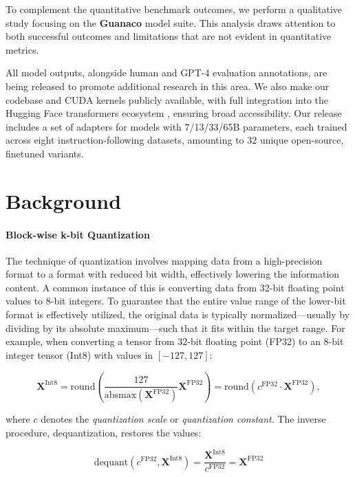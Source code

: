 To complement the quantitative benchmark outcomes, we perform a qualitative study focusing on the \textbf{Guanaco} model suite. This analysis draws attention to both successful outcomes and limitations that are not evident in quantitative metrics.

All model outputs, alongside human and GPT-4 evaluation annotations, are being released to promote additional research in this area. We also make our codebase and CUDA kernels publicly available, with full integration into the Hugging Face transformers ecosystem \citep{wolf2019huggingface}, ensuring broad accessibility. Our release includes a set of adapters for models with 7/13/33/65B parameters, each trained across eight instruction-following datasets, amounting to 32 unique open-source, finetuned variants.

\section{Background}
\paragraph{Block-wise k-bit Quantization} The technique of quantization involves mapping data from a high-precision format to a format with reduced bit width, effectively lowering the information content. A common instance of this is converting data from 32-bit floating point values to 8-bit integers. To guarantee that the entire value range of the lower-bit format is effectively utilized, the original data is typically normalized—usually by dividing by its absolute maximum—such that it fits within the target range. For example, when converting a tensor from 32-bit floating point (FP32) to an 8-bit integer tensor (Int8) with values in $[-127, 127]$:

\begin{equation}
    \mathbf{X}^{ \text{Int8}} = \text{round}\left( \frac{127}{{\text{absmax}}(\mathbf{X}^{{\text{FP32}}})}\mathbf{X}^{{\text{FP32}}} \right) = \text{round}(c^{\text{FP32}}\cdot \mathbf{X}^{{\text{FP32}}}),
\end{equation}

where $c$ denotes the {\em quantization scale} or {\em quantization constant}. The inverse procedure, dequantization, restores the values:

\begin{equation}
    \text{dequant}(c^{\text{FP32}}, \mathbf{X}^{\text{Int8}}) = \frac{\mathbf{X}^{\text{Int8}}}{c^{\text{FP32}}} = \mathbf{X}^{\text{FP32}}
\end{equation}

